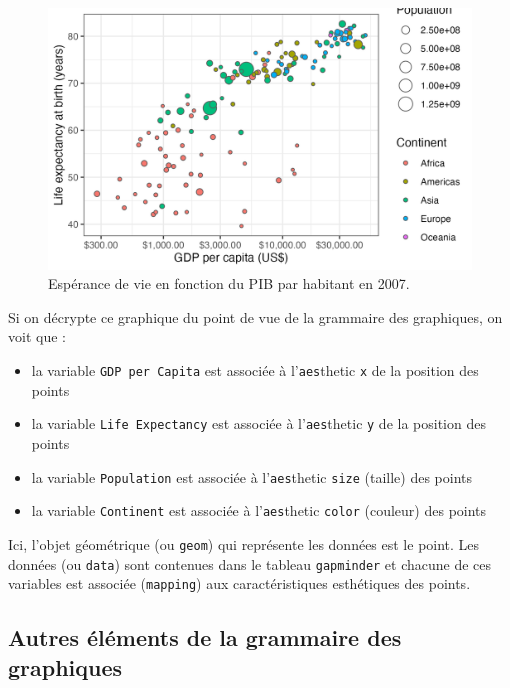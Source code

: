 \documentclass[
  letterpaper,
  DIV=11,
  numbers=noendperiod]{scrreprt}
\providecommand{\tightlist}{%
  \setlength{\itemsep}{0pt}\setlength{\parskip}{0pt}}\usepackage{longtable,booktabs,array}
\begin{document}
\begin{figure}

{\centering \includegraphics{./03-visualization_files/figure-pdf/fig-gapminder-1.png}

}

\caption{\label{fig-gapminder}Espérance de vie en fonction du PIB par
habitant en 2007.}

\end{figure}

Si on décrypte ce graphique du point de vue de la grammaire des
graphiques, on voit que :

\begin{itemize}
\tightlist
\item
  la variable \texttt{GDP\ per\ Capita} est associée à
  l'\texttt{aes}thetic \texttt{x} de la position des points
\item
  la variable \texttt{Life\ Expectancy} est associée à
  l'\texttt{aes}thetic \texttt{y} de la position des points
\item
  la variable \texttt{Population} est associée à l'\texttt{aes}thetic
  \texttt{size} (taille) des points
\item
  la variable \texttt{Continent} est associée à l'\texttt{aes}thetic
  \texttt{color} (couleur) des points
\end{itemize}

Ici, l'objet géométrique (ou \texttt{geom}) qui représente les données
est le point. Les données (ou \texttt{data}) sont contenues dans le
tableau \texttt{gapminder} et chacune de ces variables est associée
(\texttt{mapping}) aux caractéristiques esthétiques des points.

\hypertarget{autres-uxe9luxe9ments-de-la-grammaire-des-graphiques}{%
\subsection{Autres éléments de la grammaire des
graphiques}\label{autres-uxe9luxe9ments-de-la-grammaire-des-graphiques}}
\end{document}

